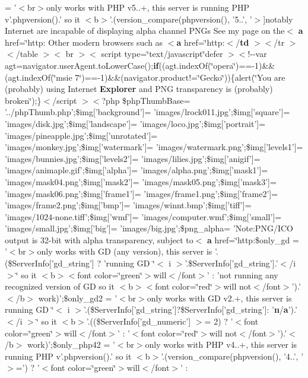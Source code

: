 {= '$<$br$>$only works with P\-H\-P v5..+, this server is running P\-H\-P v'.\-phpversion().' so it $<$b$>$'.(version\-\_\-compare(phpversion(), '5..', '$>$}]{\setlength{\rightskip}{0pt plus 5cm}notably \-Internet are incapable of displaying alpha channel \-P\-N\-Gs \-See my page on the$<$ {\bf a} href=\char`\"{}http\-:	\-Other modern browsers such as $<${\bf a} href=\char`\"{}http\-:$<$/{\bf td} $>$$<$/tr $>$$<$/table $>$$<$ br $>$$<$ script type=\char`\"{}text/javascript\char`\"{}defer $>$$<$!-\/-\/var agt=navigator.\-user\-Agent.\-to\-Lower\-Case();{\bf if}((agt.\-index\-Of(\char`\"{}opera\char`\"{})==-\/1)\&\&(agt.\-index\-Of(\char`\"{}msie 7\char`\"{})==-\/1)\&\&(navigator.\-product!=\char`\"{}\-Gecko\char`\"{}))\{alert(\char`\"{}\-You are (probably) using \-Internet {\bf \-Explorer} and \-P\-N\-G transparency is (probably) broken\char`\"{});\}$<$/script $>$$<$?php \$php\-Thumb\-Base= '../php\-Thumb.\-php';\$img\mbox{[}'background'\mbox{]}= 'images/lrock011.\-jpg';\$img\mbox{[}'square'\mbox{]}= 'images/disk.\-jpg';\$img\mbox{[}'landscape'\mbox{]}= 'images/loco.\-jpg';\$img\mbox{[}'portrait'\mbox{]}= 'images/pineapple.\-jpg';\$img\mbox{[}'unrotated'\mbox{]}= 'images/monkey.\-jpg';\$img\mbox{[}'watermark'\mbox{]}= 'images/watermark.\-png';\$img\mbox{[}'levels1'\mbox{]}= 'images/bunnies.\-jpg';\$img\mbox{[}'levels2'\mbox{]}= 'images/lilies.\-jpg';\$img\mbox{[}'anigif'\mbox{]}= 'images/animaple.\-gif';\$img\mbox{[}'alpha'\mbox{]}= 'images/alpha.\-png';\$img\mbox{[}'mask1'\mbox{]}= 'images/mask04.\-png';\$img\mbox{[}'mask2'\mbox{]}= 'images/mask05.\-png';\$img\mbox{[}'mask3'\mbox{]}= 'images/mask06.\-png';\$img\mbox{[}'frame1'\mbox{]}= 'images/frame1.\-png';\$img\mbox{[}'frame2'\mbox{]}= 'images/frame2.\-png';\$img\mbox{[}'bmp'\mbox{]}= 'images/winnt.\-bmp';\$img\mbox{[}'tiff'\mbox{]}= 'images/1024-\/none.\-tiff';\$img\mbox{[}'wmf'\mbox{]}= 'images/computer.\-wmf';\$img\mbox{[}'small'\mbox{]}= 'images/small.\-jpg';\$img\mbox{[}'big'\mbox{]}= 'images/big.\-jpg';\$png\-\_\-alpha= '\-Note\-:\-P\-N\-G/\-I\-C\-O output is 32-\/bit with alpha transparency, subject to$<$ {\bf a} href=\char`\"{}http\-:\$only\-\_\-gd     = '$<$br$>$only works with \-G\-D (any version), this server is '.(\$\-Server\-Info\mbox{[}'gd\-\_\-string'\mbox{]} ? 'running \-G\-D \char`\"{}$<$ i $>$'.\$\-Server\-Info\mbox{[}'gd\-\_\-string'\mbox{]}.'$<$/i $>$\char`\"{} so it $<$b$>$$<$font color=\char`\"{}green\char`\"{}$>$will$<$/font$>$' \-: 'not running any recognized version of \-G\-D so it $<$b$>$$<$font color=\char`\"{}red\char`\"{}$>$will not$<$/font$>$').'$<$/b$>$ work)';\$only\-\_\-gd2    = '$<$br$>$only works with \-G\-D v2.+, this server is running \-G\-D \char`\"{}$<$ i $>$'.(\$\-Server\-Info\mbox{[}'gd\-\_\-string'\mbox{]}?\$\-Server\-Info\mbox{[}'gd\-\_\-string'\mbox{]}\-: '{\bf n}/{\bf a}').'$<$/i $>$\char`\"{} so it $<$b$>$'.((\$\-Server\-Info\mbox{[}'gd\-\_\-numeric'\mbox{]} $>$= 2) ? '$<$font color=\char`\"{}green\char`\"{}$>$will$<$/font$>$' \-: '$<$font color=\char`\"{}red\char`\"{}$>$will not$<$/font$>$').'$<$/b$>$ work)';\$only\-\_\-php42  = '$<$br$>$only works with \-P\-H\-P v4..+, this server is running \-P\-H\-P v'.phpversion().' so it $<$b$>$'.(version\-\_\-compare(phpversion(), '4..', '$>$=') ? '$<$font color=\char`\"{}green\char`\"{}$>$will$<$/font$>$' \-: }
